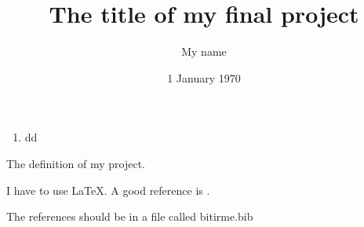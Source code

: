 \documentclass{beamer}
\begin{document}
 
\begin{frontpage}
  \title{The title of my final project}
  \author{My name}
  \date{1 January 1970}
\end{frontpage}

\begin{contents}
  \begin{enumerate}
   \item dd
  \end{enumerate}

\end{contents}
 
\begin{projectdefinition}
  The definition of my project.
\end{projectdefinition}

\begin{projectdesign}
 
\end{projectdesign}

\begin{projectrequirements}
  I have to use \LaTeX. 
  A good reference is \cite{lamport}.
\end{projectrequirements}

\begin{projectsuccess}
 
\end{projectsuccess}

\begin{projectreferences}
 The references should be in a file called bitirme.bib
\end{projectreferences}
\end{document}
